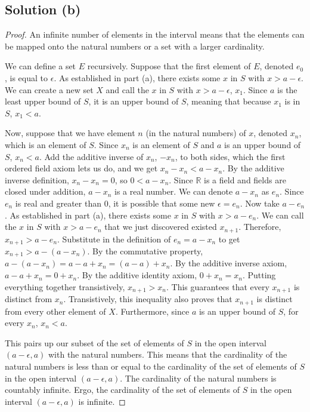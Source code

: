 \documentclass[11pt]{article}
\begin{document}
    \subsection{Solution (b)}
    \begin{proof}
        An infinite number of elements in the interval means that the elements can be mapped onto the natural numbers or a set with a larger cardinality.

        We can define a set $E$ recursively. 
        Suppose that the first element of $E$, denoted $e_0$, is equal to $\epsilon$.
        As established in part (a), there exists some $x$ in $S$ with $x > a - \epsilon$.
        We can create a new set $X$ and call the $x$ in $S$ with $x > a - \epsilon$, $x_1$.
        Since $a$ is the least upper bound of $S$, it is an upper bound of $S$, meaning that because $x_1$ is in $S$, $x_1 < a$.
        
        Now, suppose that we have element $n$ (in the natural numbers) of $x$, denoted $x_n$, which is an element of $S$.
        Since $x_n$ is an element of $S$ and $a$ is an upper bound of $S$, $x_n < a$.
        Add the additive inverse of $x_n$, $-x_n$, to both sides, which the first ordered field axiom lets us do, and we get $x_n - x_n < a - x_n$.
        By the additive inverse definition, $x_n - x_n = 0$, so $0 < a - x_n$.
        Since $\mathbb{R}$ is a field and fields are closed under addition, $a - x_n$ is a real number.
        We can denote $a - x_n$ as $e_n$.
        Since $e_n$ is real and greater than $0$, it is possible that some new $\epsilon = e_n$.
        Now take $a - e_n$.
        As established in part (a), there exists some $x$ in $S$ with $x > a - e_n$.
        We can call the $x$ in $S$ with $x > a - e_n$ that we just discovered existed $x_{n + 1}$.
        Therefore, $x_{n + 1} > a - e_n$.
        Substitute in the definition of $e_n = a - x_n$ to get $x_{n + 1} > a - (a - x_n)$.
            By the commutative property, $a - (a - x_n) = a - a + x_n = (a - a) + x_n$.
            By the additive inverse axiom, $a - a + x_n = 0 + x_n$.
            By the additive identity axiom, $0 + x_n = x_n$.
        Putting everything together transistively, $x_{n + 1} > x_n$.
        This guarantees that every $x_{n + 1}$ is distinct from $x_n$.
        Transistively, this inequality also proves that $x_{n + 1}$ is distinct from every other element of $X$.
        Furthermore, since $a$ is an upper bound of $S$, for every $x_n$, $x_n < a$.

        This pairs up our subset of the set of elements of $S$ in the open interval $(a - \epsilon, a)$ with the natural numbers.
        This means that the cardinality of the natural numbers is less than or equal to the cardinality of the set of elements of $S$ in the open interval $(a - \epsilon, a)$.
        The cardinality of the natural numbers is countably infinite.
        Ergo, the cardinality of the set of elements of $S$ in the open interval $(a - \epsilon, a)$ is infinite.
    \end{proof}
\end{document}
